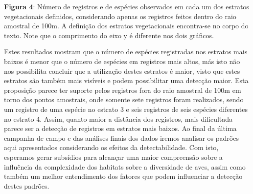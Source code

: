 \textbf{Figura 4}: Número de registros e de espécies observados em cada um dos estratos vegetacionais definidos, considerando apenas os registros feitos dentro do raio amostral de 100m. A definição dos estratos vegetacionais encontra-se no corpo do texto. Note que o comprimento do eixo y é diferente nos dois gráficos.

Estes resultados mostram que o número de espécies registradas nos estratos mais baixos é menor que o número de espécies em registros mais altos, más isto não nos possibilita concluir que a utilização destes estratos é maior, visto que estes estratos são também mais visíveis e podem possibilitar uma detecção maior. Esta proposição parece ter suporte pelos registros fora do raio amostral de 100m em torno dos pontos amostrais, onde somente sete registros foram realizados, sendo um registro de uma espécie no estrato 3 e seis registros de seis espécies diferentes no estrato 4. Assim, quanto maior a distância dos registros, mais dificultada parece ser a detecção de registros em estratos mais baixos. Ao final da última campanha de campo e das análises finais dos dados iremos analisar os padrões aqui apresentados considerando os efeitos da detectabilidade. Com isto, esperamos gerar subsídios para alcançar uma maior compreensão sobre a influência da complexidade dos habitats sobre a diversidade de aves, assim como também um melhor entendimento dos fatores que podem influenciar a detecção destes padrões.